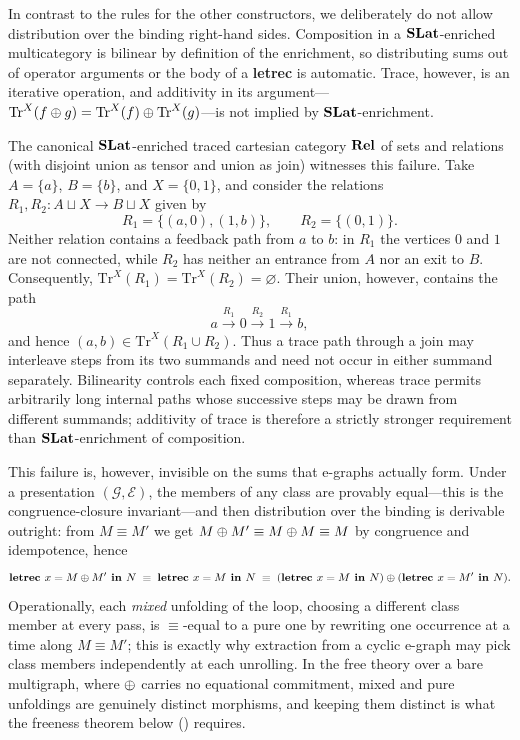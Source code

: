 In contrast to the rules for the other constructors, we deliberately do not allow distribution over the binding right-hand sides.
Composition in a $\mathbf{SLat}$-enriched multicategory is bilinear by definition of the enrichment, so distributing sums out of operator arguments or the body of a \textbf{letrec} is automatic.
Trace, however, is an iterative operation, and additivity in its argument---$\text{Tr}^X(f \mathbin{\oplus} g) = \text{Tr}^X(f) \mathbin{\oplus} \text{Tr}^X(g)$---is not implied by $\mathbf{SLat}$-enrichment.

The canonical $\mathbf{SLat}$-enriched traced cartesian category $\mathbf{Rel}$ of sets and relations (with disjoint union as tensor and union as join) witnesses this failure.
Take $A = \{a\}$, $B = \{b\}$, and $X = \{0,1\}$, and consider the relations $R_1,R_2 : A \sqcup X \to B \sqcup X$ given by
\[
R_1 = \{(a,0),(1,b)\},
\qquad
R_2 = \{(0,1)\}.
\]
Neither relation contains a feedback path from $a$ to $b$: in $R_1$ the vertices $0$ and $1$ are not connected, while $R_2$ has neither an entrance from $A$ nor an exit to $B$.
Consequently, $\text{Tr}^X(R_1) = \text{Tr}^X(R_2) = \varnothing$.
Their union, however, contains the path
\[
a \xrightarrow{R_1} 0 \xrightarrow{R_2} 1 \xrightarrow{R_1} b,
\]
and hence $(a,b) \in \text{Tr}^X(R_1 \cup R_2)$.
Thus a trace path through a join may interleave steps from its two summands and need not occur in either summand separately.
Bilinearity controls each fixed composition, whereas trace permits arbitrarily long internal paths whose successive steps may be drawn from different summands; additivity of trace is therefore a strictly stronger requirement than $\mathbf{SLat}$-enrichment of composition.

This failure is, however, invisible on the sums that e-graphs actually form.
Under a presentation $(\mathcal{G}, \mathcal{E})$, the members of any class are provably equal---this is the congruence-closure invariant---and then distribution over the binding is derivable outright: from $M \equiv M'$ we get $M \mathbin{\oplus} M' \equiv M \mathbin{\oplus} M \equiv M$ by congruence and idempotence, hence
\[
\textbf{letrec } x = M \mathbin{\oplus} M' \textbf{ in } N \;\equiv\; \textbf{letrec } x = M \textbf{ in } N \;\equiv\; (\textbf{letrec } x = M \textbf{ in } N) \mathbin{\oplus} (\textbf{letrec } x = M' \textbf{ in } N).
\]
Operationally, each \emph{mixed} unfolding of the loop, choosing a different class member at every pass, is $\equiv$-equal to a pure one by rewriting one occurrence at a time along $M \equiv M'$; this is exactly why extraction from a cyclic e-graph may pick class members independently at each unrolling.
In the free theory over a bare multigraph, where $\mathbin{\oplus}$ carries no equational commitment, mixed and pure unfoldings are genuinely distinct morphisms, and keeping them distinct is what the freeness theorem below () requires.

